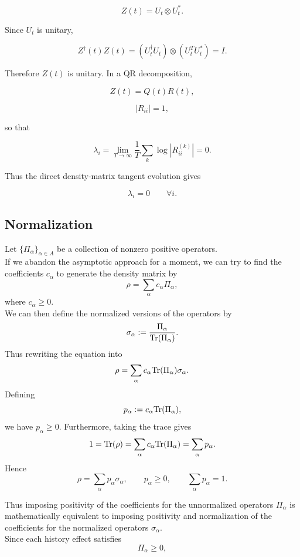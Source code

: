 \documentclass{article}
\begin{document}
$$
Z(t)=U_t\otimes U_t^*.
$$

Since \(U_t\) is unitary,

$$
Z^\dagger(t)Z(t)
=
(U_t^\dagger U_t)\otimes
(U_t^T U_t^*)
=
I.
$$

Therefore \(Z(t)\) is unitary. In a QR decomposition,

$$
Z(t)=Q(t)R(t),
$$

$$
|R_{ii}|=1,
$$

so that

$$
\lambda_i
=
\lim_{T\to\infty}
\frac1T
\sum_k \log |R_{ii}^{(k)}|
=
0.
$$

Thus the direct density-matrix tangent evolution gives

$$
\boxed{\lambda_i=0\qquad\forall i.}
$$
\subsection{Normalization}
Let \(\{\Pi_\alpha\}_{\alpha\in A}\) be a collection of nonzero positive operators. \\
If we abandon the asymptotic approach for a moment, we can try to find the coefficients $c_\alpha$ to generate the density matrix by
\begin{equation}
    \rho=\sum_\alpha c_\alpha \Pi_\alpha,
\end{equation}
where $c_\alpha \geq 0$. \\
We can then define the normalized versions of the operators by
\begin{equation}
\sigma_\alpha:=\frac{\Pi_\alpha}{\text{Tr}(\Pi_\alpha)}.
\end{equation}
Thus rewriting the equation into
\begin{equation}
\rho=\sum_\alpha c_\alpha\text{Tr}(\Pi_\alpha)\sigma_\alpha.
\end{equation}
Defining
\begin{equation}
p_\alpha:=c_\alpha\text{Tr}(\Pi_\alpha),
\end{equation}
we have \(p_\alpha\geq0\). Furthermore, taking the trace gives
\begin{equation}
1
=
\text{Tr}(\rho)
=
\sum_\alpha
c_\alpha\text{Tr}(\Pi_\alpha)
=
\sum_\alpha p_\alpha.
\end{equation}
Hence
\begin{equation}
\rho
=
\sum_\alpha p_\alpha\sigma_\alpha,
\qquad
p_\alpha\geq0,
\qquad
\sum_\alpha p_\alpha=1.
\end{equation}

Thus imposing positivity of the coefficients for the unnormalized operators \(\Pi_\alpha\) is mathematically equivalent to imposing positivity and normalization of the coefficients for the normalized operators \(\sigma_\alpha\).\\
Since each history effect satisfies
$$
\Pi_\alpha\geq 0,
$$
\end{document}
